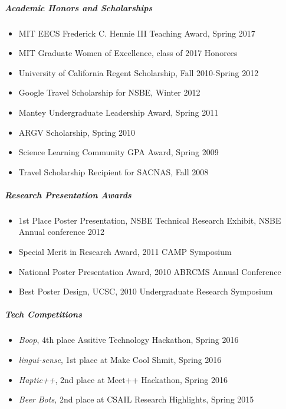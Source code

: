 \documentclass[10pt,letterpaper]{article}
\begin{document}
\subparagraph{Academic Honors and Scholarships}
\begin{itemize}
\item MIT EECS Frederick C. Hennie III Teaching Award, Spring 2017
\item MIT Graduate Women of Excellence, class of 2017 Honorees
\item University of California Regent Scholarship, Fall 2010-Spring 2012 
\item  Google Travel Scholarship for NSBE,  Winter 2012 
\item Mantey Undergraduate Leadership Award,  Spring 2011 
 \item ARGV Scholarship, Spring 2010 
\item  Science Learning Community GPA Award, Spring 2009 
\item Travel Scholarship Recipient for SACNAS, Fall 2008 
\end{itemize}

\subparagraph{Research Presentation Awards}
\begin{itemize}
\item 1st Place Poster Presentation, NSBE Technical Research Exhibit, NSBE Annual conference 2012
\item Special Merit in Research Award,  2011 CAMP Symposium 
\item  National Poster Presentation Award, 2010 ABRCMS Annual Conference
\item Best Poster Design, UCSC, 2010 Undergraduate Research Symposium
\end{itemize}

\subparagraph{Tech Competitions}
\begin{itemize}
\item {\em Boop}, 4th place Assitive Technology Hackathon, Spring 2016
\item {\em lingui-sense}, 1st place at Make Cool Shmit, Spring 2016
\item {\em Haptic++}, 2nd place at Meet++ Hackathon, Spring 2016
\item {\em Beer Bots,} 2nd place at CSAIL Research Highlights, Spring 2015 
\end{itemize}
\end{document}
